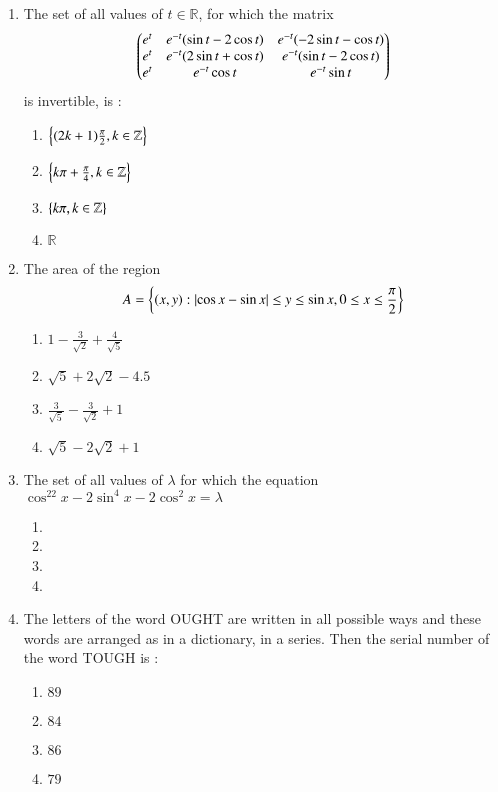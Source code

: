 \documentclass[journal,12pt,twocolumn]{IEEEtran}
\theoremstyle{remark}
\begin{document}
\begin{enumerate}
    \item The set of all values of $t\in\mathbb{R}$, for which the matrix $$\begin{pmatrix}e^t & e^{-t}(\sin{t}-2\cos{t}) & e^{-t}(-2\sin{t}-\cos{t}) \\ e^t & e^{-t}(2\sin{t}+\cos{t}) & e^{-t}(\sin{t}-2\cos{t}) \\ e^t & e^{-t}\cos{t} & e^{-t}\sin{t}\end{pmatrix}$$ is invertible, is :
        \begin{enumerate}
            \item $\left\{(2k+1)\frac{\pi}{2},k\in\mathbb{Z}\right\}$
            \item $\left\{k\pi+\frac{\pi}{4},k\in\mathbb{Z}\right\}$
            \item $\left\{k\pi,k\in\mathbb{Z}\right\}$
            \item $\mathbb{R}$
        \end{enumerate}


    \item The area of the region $$A=\left\{(x,y):\left\vert\cos x-\sin x\right\vert\leq y\leq\sin x, 0\leq x\leq\frac{\pi}{2}\right\}$$
        \begin{enumerate}
            \item $1 - \frac{3}{\sqrt{2}} + \frac{4}{\sqrt{5}}$
            \item $\sqrt{5} + 2\sqrt{2} - 4.5$
            \item $\frac{3}{\sqrt{5}} - \frac{3}{\sqrt{2}} + 1$
            \item $\sqrt{5} - 2\sqrt{2} + 1$
        \end{enumerate}

    \item The set of all values of $\lambda$ for which the equation $\cos^22x-2\sin^4x-2\cos^2x=\lambda$ 
        \begin{enumerate}
            \item {}
            \item {}
            \item {}
            \item {}
        \end{enumerate}

    \item The letters of the word OUGHT are written in all possible ways and these words are arranged as in a dictionary, in a series. Then the serial number of the word TOUGH is :
        \begin{enumerate}
            \item $89$
            \item $84$
            \item $86$
            \item $79$
        \end{enumerate}


\end{enumerate}
\end{document}

